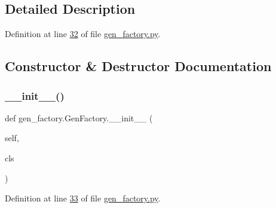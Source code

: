\subsection{Detailed Description}


Definition at line \hyperlink{gen__factory_8py_source_l00032}{32} of file \hyperlink{gen__factory_8py_source}{gen\+\_\+factory.\+py}.



\subsection{Constructor \& Destructor Documentation}
\mbox{\label{classgen__factory_1_1_gen_factory_a519ddaf62a8d97e9ee0624e91ac39368}} 
\subsubsection{\texorpdfstring{\+\_\+\+\_\+init\+\_\+\+\_\+()}{\_\_init\_\_()}}
{\footnotesize\ttfamily def gen\+\_\+factory.\+Gen\+Factory.\+\_\+\+\_\+init\+\_\+\+\_\+ (\begin{DoxyParamCaption}\item[{}]{self,  }\item[{}]{cls }\end{DoxyParamCaption})}



Definition at line \hyperlink{gen__factory_8py_source_l00033}{33} of file \hyperlink{gen__factory_8py_source}{gen\+\_\+factory.\+py}.


